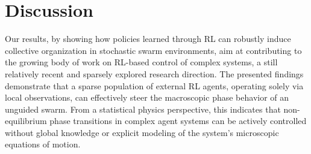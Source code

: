 \documentclass[openacc]{rsproca_new}
\begin{document}

\section{Discussion}
\label{sec:Discussion}
Our results, by showing how policies learned through RL can robustly induce collective organization in stochastic swarm environments, aim at contributing to the growing body of work on RL-based control of complex systems, a still relatively recent and sparsely explored research direction. The presented findings demonstrate that a sparse population of external RL agents, operating solely via local observations, can effectively steer the macroscopic phase behavior of an unguided swarm. From a statistical physics perspective, this indicates that non-equilibrium phase transitions in complex agent systems can be actively controlled without global knowledge or explicit modeling of the system’s microscopic equations of motion.
\end{document}
